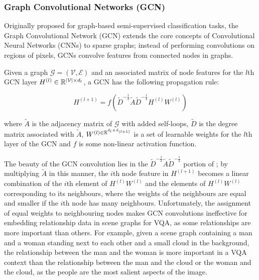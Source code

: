 \subsubsection{Graph Convolutional Networks (GCN)}
Originally proposed for graph-based semi-supervised classification tasks, the Graph Convolutional Network (GCN) extends the core concepts of Convolutional Neural Networks (CNNs) to sparse graphs; instead of performing convolutions on regions of pixels, GCNs convolve features from connected nodes in graphs.

Given a graph \(\mathcal{G} = (\mathcal{V}, \mathcal{E})\) and an associated matrix of node features for the \(l\)th GCN layer \(H^{(l)} \in \mathbb{R}^{|\mathcal{V}| \times d_l}\), a GCN has the following propagation rule:

\begin{equation}
    H^{(l + 1)} = f\left(\tilde{D}^{-\frac{1}{2}}\tilde{A}\tilde{D}^{-\frac{1}{2}}H^{(l)}W^{(l)}\right)
    \label{equation:gcn_propagation_rule}
\end{equation}

where \(\tilde{A}\) is the adjacency matrix of \(\mathcal{G}\) with added self-loops, \(\tilde{D}\) is the degree matrix associated with \(\tilde{A}\), \(W^{(l) \in \mathbb{R}^{d_l \times d_{(l+1)}}}\) is a set of learnable weights for the \(l\)th layer of the GCN and \(f\) is some non-linear activation function.

The beauty of the GCN convolution lies in the \(\tilde{D}^{-\frac{1}{2}}\tilde{A}\tilde{D}^{-\frac{1}{2}}\) portion of \equationautorefname{ \ref{equation:gcn_propagation_rule}}; by multiplying \(\tilde{A}\) in this manner, the \(i\)th node feature in \(H^{(l + 1)}\) becomes a linear combination of the \(i\)th element of \(H^{(l)}W^{(l)}\) and the elements of \(H^{(l)}W^{(l)}\) corresponding to its neighbours, where the weights of the neighbours are equal and smaller if the \(i\)th node has many neighbours. Unfortunately, the assignment of equal weights to neighbouring nodes makes GCN convolutions ineffective for embedding relationship data in scene graphs for VQA, as some relationships are more important than others. For example, given a scene graph containing a man and a woman standing next to each other and a small cloud in the background, the relationship between the man and the woman is more important in a VQA context than the relationship between the man and the cloud or the woman and the cloud, as the people are the most salient aspects of the image.

